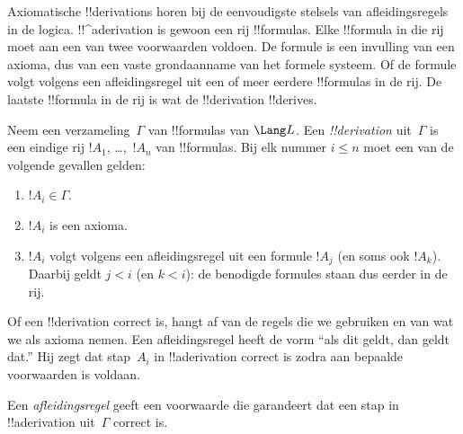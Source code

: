 \documentclass[../../../include/open-logic-section]{subfiles}
\begin{document}
      {}
      {}


\begin{explain}
  Axiomatische !!{derivation}s horen bij de eenvoudigste stelsels van
  afleidingsregels in de logica. !!^a{derivation} is gewoon een rij
  !!{formula}s. Elke !!{formula} in die rij moet aan een van twee
  voorwaarden voldoen. De formule is een invulling van een axioma, dus
  van een vaste grondaanname van het formele systeem. Of de formule
  volgt volgens een afleidingsregel uit een of meer eerdere
  !!{formula}s in de rij. De laatste !!{formula} in de rij is wat de
  !!{derivation} !!{derive}s.
\end{explain}

\begin{defn}[!!^{derivability}]
Neem een verzameling~$\Gamma$ van !!{formula}s van $\Lang L$. Een
\emph{!!{derivation}} uit~$\Gamma$ is een eindige rij $!A_1$,
\dots,~$!A_n$ van !!{formula}s. Bij elk nummer $i \le n$ moet een van
de volgende gevallen gelden:
\begin{enumerate}
\item $!A_i \in \Gamma$.
\item $!A_i$ is een axioma.
\item $!A_i$ volgt volgens een afleidingsregel uit een formule $!A_j$
  (en soms ook $!A_k$). Daarbij geldt $j < i$ (en $k < i$): de
  benodigde formules staan dus eerder in de rij.
\end{enumerate}
\end{defn}

Of een !!{derivation} correct is, hangt af van de regels die we
gebruiken en van wat we als axioma nemen. Een afleidingsregel heeft de
vorm ``als dit geldt, dan geldt dat.'' Hij zegt dat stap~$A_i$ in
!!a{derivation} correct is zodra aan bepaalde voorwaarden is voldaan.

\begin{defn}[Afleidingsregel]
Een \emph{afleidingsregel} geeft een voorwaarde die garandeert dat een
stap in !!a{derivation} uit~$\Gamma$ correct is.
\end{defn}
\end{document}
